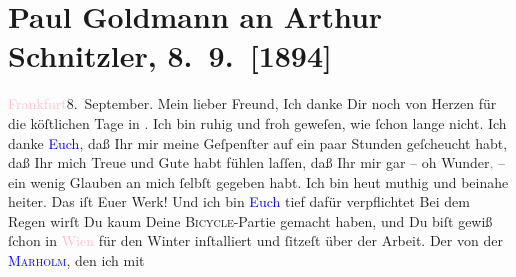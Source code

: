 

               \section[Paul Goldmann an Arthur Schnitzler, 8. 9. {[}1894{]}]{ Paul Goldmann an Arthur Schnitzler, 8. 9. {[}1894{]}}\nopagebreak{}\rehead{ }\normalsize\beginnumbering{} \toendnotes[C]{\smallbreak\pagebreak[2]} 
\toendnotes[C]{\smallbreak}\pstart
           \raggedleft{}{\pb}\textcolor{pink}{Frankfurt}{}\ledrightnote{\textcolor{pink}{Frankfurt am Main}}{ }8. September.\pend
           \pstart\center{}Mein lieber Freund,\pend\pstart
           Ich danke Dir noch von Herzen für die köſtlichen Tage in \label{K_L02612-1v}\label{K_L02612-1h}. Ich bin
               ruhig und froh geweſen, wie ſchon lange nicht. Ich danke \textcolor{blue}{Euch}{}, daß Ihr mir meine
               Geſpenſter auf ein paar Stunden geſcheucht habt, daß Ihr mich Treue und Gute habt
               fühlen laſſen, {\pb}daß Ihr mir gar – oh
                  Wunder\textcolor{gray}{,} – ein wenig Glauben an mich ſelbſt gegeben habt. Ich
               bin heut muthig und beinahe heiter. Das iſt Euer Werk!
               Und ich bin \textcolor{blue}{Euch}{}
               tief dafür \strikeout{\textcolor{gray}{v}} verpflichtet{\dotsfive}\pend
           \pstart
           Bei dem Regen wirſt Du kaum Deine \textsc{Bicycle}-Partie gemacht
               haben, und Du biſt gewiß ſchon in \textcolor{pink}{Wien}{}\ledrightnote{\textcolor{pink}{Wien}} für den Winter
               inſtalliert und ſitzeſt über der Arbeit. Der \label{K_mets_Goldmann_94-partII-999v}\label{K_mets_Goldmann_94-partII-999h}{ }{\pb}von der \textsc{\textcolor{blue}{Marholm}{}\ledrightnote{\textcolor{blue}{Laura Marholm}}}, den ich mit
